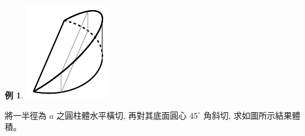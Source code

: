 \documentclass[12pt]{extarticle}
\theoremstyle{definition}
\newtheorem*{ex}{例}
\begin{document}

\begin{ex}
  \begin{minipage}{0.15\textwidth}
    \includegraphics[scale=1,page=1]{notch2}
  \end{minipage}
  \begin{minipage}{0.8\textwidth}
    將一半徑為 $a$ 之圓柱體水平橫切, 再對其底面圓心 $45^\circ$ 角斜切, 求如圖所示結果體積。
  \end{minipage}
\end{ex}
\end{document}
